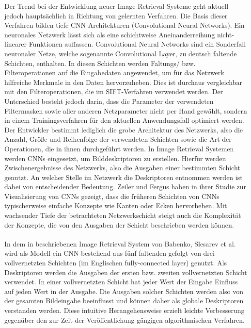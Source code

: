 Der Trend bei der Entwicklung neuer Image Retrieval Systeme geht aktuell jedoch hauptsächlich in Richtung von gelernten Verfahren. Die Basis dieser Verfahren bilden tiefe CNN-Architekturen (Convolutional Neural Networks). Ein neuronales Netzwerk lässt sich als eine schichtweise Aneinanderreihung nicht-linearer Funktionen auffassen. Convolutional Neural Networks sind ein Sonderfall neuronaler Netze, welche sogenannte Convolutional Layer, zu deutsch faltende Schichten, enthalten. In diesen Schichten werden Faltungs/ bzw. Filteroperationen auf die Eingabedaten angewendet, um für das Netzwerk hilfreiche Merkmale in den Daten hervorzuheben. Dies ist durchaus vergleichbar mit den Filteroperationen, die im SIFT-Verfahren verwendet werden. Der Unterschied besteht jedoch darin, dass die Parameter der verwendeten Filtermasken sowie aller anderen Netzparameter nicht per Hand gewählt, sondern in einem Trainingsverfahren für den aktuellen Anwendungsfall optimiert werden. Der Entwickler bestimmt lediglich die grobe Architektur des Netzwerks, also die Anzahl, Größe und Reihenfolge der verwendeten Schichten sowie die Art der Operationen, die in ihnen durchgeführt werden. In Image Retrieval Systemen werden CNNs eingesetzt, um Bilddeskriptoren zu erstellen. Hierfür werden Zwischenergebnisse des Netzwerks, also die Ausgaben einer bestimmten Schicht genutzt. An welcher Stelle im Netzwerk die Deskriptoren entnommen werden ist dabei von entscheidender Bedeutung. Zeiler und Fergus haben in ihrer Studie zur Visualisierung von CNNs gezeigt, dass die früheren Schichten von CNNs typischerweise einfache Konzepte wie Kanten oder Ecken hervorheben. Mit wachsender Tiefe der betrachteten Netzwerkschicht steigt auch die Komplexität der Konzepte, die von den Ausgaben der Schicht beschrieben werden können.
\\\\
In dem in \cite{fc_extraction_neural_codes} beschriebenen Image Retrieval System von Babenko, Slesarev et al. wird als Modell ein CNN bestehend aus fünf faltenden gefolgt von drei vollvernetzten Schichten (im Englischen fully-connected layer) genutzt. Als Deskriptoren werden die Ausgaben der ersten bzw. zweiten vollvernetzten Schicht verwendet. In einer vollvernetzten Schicht hat jeder Wert der Eingabe Einfluss auf jeden Wert in der Ausgabe. Die Ausgaben solcher Schichten werden also von der gesamten Bildeingabe beeinflusst und können daher als globale Deskriptoren verstanden werden. Diese intuitive Herangehensweise erzielt leichte Verbesserung gegenüber den zur Zeit der Veröffentlichung gängigen algorithmischen Verfahren.
